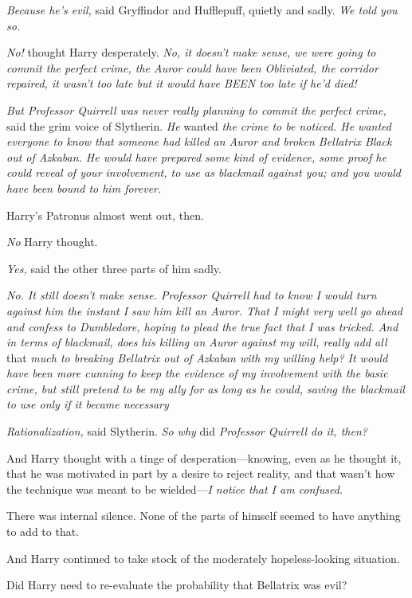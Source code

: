 \emph{Because he's evil,} said Gryffindor and Hufflepuff, quietly and sadly.
\emph{We told you so.}

\emph{No!} thought Harry desperately. \emph{No, it doesn't make sense, we were
going to commit the perfect crime, the Auror could have been Obliviated, the
corridor repaired, it wasn't too late but it would have BEEN too late if he'd
died!}

\emph{But Professor Quirrell was never really planning to commit the perfect
crime,} said the grim voice of Slytherin. \emph{He} wanted \emph{the crime to
be noticed. He wanted everyone to know that someone had killed an Auror and
broken Bellatrix Black out of Azkaban. He would have prepared some kind of
evidence, some proof he could reveal of your involvement, to use as blackmail
against you; and you would have been bound to him forever.}

Harry's Patronus almost went out, then.

\emph{No{\el}} Harry thought.

\emph{Yes,} said the other three parts of him sadly.

\emph{No. It still doesn't make sense. Professor Quirrell had to know I would
turn against him the instant I saw him kill an Auror. That I might very well go
ahead and confess to Dumbledore, hoping to plead the true fact that I was
tricked. And{\el} in terms of blackmail, does his killing an Auror against
my will, really add all} that \emph{much to breaking Bellatrix out of Azkaban
with my willing help? It would have been more cunning to keep the evidence of
my involvement with the basic crime, but still pretend to be my ally for as
long as he could, saving the blackmail to use only if it became
necessary{\el}}

\emph{Rationalization,} said Slytherin. \emph{So why} did \emph{Professor
Quirrell do it, then?}

And Harry thought with a tinge of desperation---knowing, even as he thought it,
that he was motivated in part by a desire to reject reality, and that wasn't
how the technique was meant to be wielded---\emph{I notice that I am confused.}

There was internal silence. None of the parts of himself seemed to have
anything to add to that.

And Harry continued to take stock of the moderately hopeless-looking situation.

Did Harry need to re-evaluate the probability that Bellatrix was evil?

